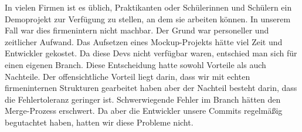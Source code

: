 In vielen Firmen ist es üblich, Praktikanten oder Schülerinnen und Schülern ein Demoprojekt zur Verfügung zu stellen, an dem sie arbeiten können.
In unserem Fall war dies firmenintern nicht machbar.
Der Grund war personeller und zeitlicher Aufwand.
Das Aufsetzen eines Mockup-Projekts hätte viel Zeit und Entwickler gekostet.
Da diese Devs nicht verfügbar waren, entschied man sich für einen eigenen Branch.
Diese Entscheidung hatte sowohl Vorteile als auch Nachteile.
Der offensichtliche Vorteil liegt darin, dass wir mit echten firmeninternen Strukturen gearbeitet haben aber der Nachteil besteht darin, dass die Fehlertoleranz geringer ist.
Schwerwiegende Fehler im Branch hätten den Merge-Prozess erschwert.
Da aber die Entwickler unsere Commits regelmäßig begutachtet haben, hatten wir diese Probleme nicht.








































